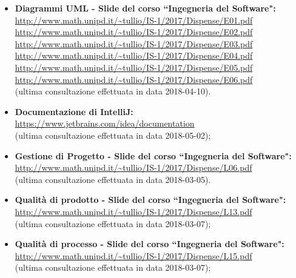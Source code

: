\begin{itemize}
				\item
                \textbf{Diagrammi UML - Slide del corso ``Ingegneria del Software":}\\
                \url{http://www.math.unipd.it/~tullio/IS-1/2017/Dispense/E01.pdf} \\
                \url{http://www.math.unipd.it/~tullio/IS-1/2017/Dispense/E02.pdf} \\
                \url{http://www.math.unipd.it/~tullio/IS-1/2017/Dispense/E03.pdf} \\
                \url{http://www.math.unipd.it/~tullio/IS-1/2017/Dispense/E04.pdf} \\
                \url{http://www.math.unipd.it/~tullio/IS-1/2017/Dispense/E05.pdf} \\
                \url{http://www.math.unipd.it/~tullio/IS-1/2017/Dispense/E06.pdf} \\
                (ultima consultazione effettuata in data 2018-04-10).

                \item
                \textbf{Documentazione di IntelliJ:}\\
                \url{https://www.jetbrains.com/idea/documentation} \\
                (ultima consultazione effettuata in data 2018-05-02);

                \item
                \textbf{Gestione di Progetto - Slide del corso ``Ingegneria del Software":}\\
                \url{http://www.math.unipd.it/~tullio/IS-1/2017/Dispense/L06.pdf} \\
                (ultima consultazione effettuata in data 2018-03-05).
            
				\item\textbf{Qualità di prodotto - Slide del corso ``Ingegneria del Software":}\\
				\url{http://www.math.unipd.it/~tullio/IS-1/2017/Dispense/L13.pdf}\\
				(ultima consultazione effettuata in data 2018-03-07);
		
				\item\textbf{Qualità di processo - Slide del corso ``Ingegneria del Software":}\\
				\url{http://www.math.unipd.it/~tullio/IS-1/2017/Dispense/L15.pdf}\\
				(ultima consultazione effettuata in data 2018-03-07);


\end{itemize}
